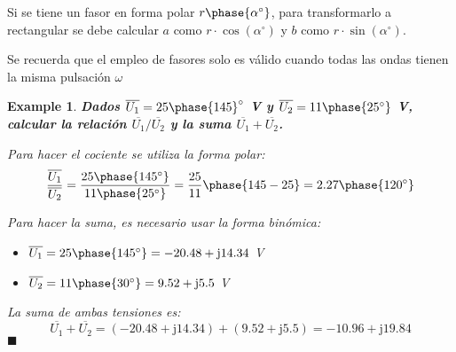 \documentclass[11pt]{book} %
\numberwithin{dummy}{section}
\theoremstyle{ocrenumbox}
\theoremstyle{blacknumex}
\newtheorem{exampleT}{Example}[chapter]
\theoremstyle{blacknumbox}
\theoremstyle{ocrenum}
\newenvironment{example}{\begin{exampleT}}{\hfill{\tiny\ensuremath{\blacksquare}}\end{exampleT}}
\newenvironment{remark}{\par\vspace{10pt}\small %
\begin{list}{}{
\leftmargin=35pt %
\rightmargin=25pt}\item\ignorespaces %
\makebox[-2.5pt]{\begin{tikzpicture}[overlay]
\node[draw=ocre!60,line width=1pt,circle,fill=ocre!25,font=\sffamily\bfseries,inner sep=2pt,outer sep=0pt] at (-15pt,0pt){\textcolor{ocre}{N}};\end{tikzpicture}} %
\advance\baselineskip -1pt}{\end{list}\vskip5pt} %
\newlength\esp
\begin{document}
	\begin{remark}
		Si se tiene un fasor en forma polar $r\phase{\alpha^\circ}$, para transformarlo a rectangular se debe calcular $a$ como $r\cdot \cos(\alpha^\circ)$ y $b$ como $r\cdot \sin(\alpha^\circ)$.
	\end{remark}
	
	\begin{remark}
		Se recuerda que el empleo de fasores solo es válido cuando todas las ondas tienen la misma pulsación $\omega$
	\end{remark}
	
	\vspace{4mm}
	\begin{example}
		\textbf{Dados $\overline{U_1}=25\phase{145}^\circ$ V y $\overline{U_2}=11\phase{25^\circ}$ V, calcular la relación $\overline{U_1}/\overline{U_2}$ y la suma $\overline{U_1}+\overline{U_2}$.}
		
		Para hacer el cociente se utiliza la forma polar: 
		\begin{equation*}
			\dfrac{\overline{U_1}}{\overline{U_2}}=\dfrac{25\phase{145^\circ}}{11\phase{25^\circ}}=\dfrac{25}{11}\phase{145-25}=2.27\phase{120^\circ}
		\end{equation*}
		
		Para hacer la suma, es necesario usar la forma binómica:
		\begin{itemize}
			\item $\overline{U_1}=25\phase{145^\circ}=-20.48+\mathrm{j} 14.34$ V
			\item $\overline{U_2}=11\phase{30^\circ}=9.52+\mathrm{j} 5.5$ V
		\end{itemize}
		
		La suma de ambas tensiones es: 
		\begin{equation*}
			\overline{U_1}+\overline{U_2}=(-20.48+\mathrm{j}14.34)+(9.52+\mathrm{j}5.5)=-10.96+\mathrm{j}19.84
		\end{equation*}
	\end{example}
	
\end{document}
